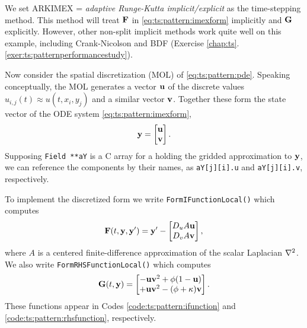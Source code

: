 We set ARKIMEX = \emph{adaptive Runge-Kutta implicit/explicit} \citep{AscherRuuthSpiteri1997} as the time-stepping method.  This method will treat $\mathbf{F}$ in \eqref{eq:ts:pattern:imexform} implicitly and $\mathbf{G}$ explicitly.  However, other non-split implicit methods work quite well on this example, including Crank-Nicolson and BDF (Exercise \ref{chap:ts}.\ref{exer:ts:patternperformancestudy}).


Now consider the spatial discretization (MOL) of \eqref{eq:ts:pattern:pde}.  Speaking conceptually, the MOL generates a vector $\mathbf{u}$ of the discrete values $u_{i,j}(t) \approx u(t,x_i,y_j)$ and a similar vector $\mathbf{v}$.  Together these form the state vector of the ODE system \eqref{eq:ts:pattern:imexform}, 
\begin{equation}
\mathbf{y} = \begin{bmatrix} \mathbf{u} \\ \mathbf{v} \end{bmatrix}.  \label{eq:ts:pattern:blockvars}
\end{equation}
Supposing \texttt{Field **aY} is a C array for a \pVec holding the gridded approximation to $\mathbf{y}$, we can reference the components by their names, as \texttt{aY[j][i].u} and \texttt{aY[j][i].v}, respectively.

To implement the discretized form we write \texttt{FormIFunctionLocal()} which computes
\begin{equation}
\mathbf{F}(t,\mathbf{y},\mathbf{y}') = \mathbf{y}' - \begin{bmatrix} D_u A \mathbf{u} \\ D_v A \mathbf{v} \end{bmatrix},  \label{eq:ts:pattern:blockifunction}
\end{equation}
where $A$ is a centered finite-difference approximation of the scalar Laplacian $\nabla^2$.  We also write \texttt{FormRHSFunctionLocal()} which computes
\begin{equation}
\mathbf{G}(t,\mathbf{y}) = \begin{bmatrix}
- \mathbf{u} \mathbf{v}^2 + \phi (1-\mathbf{u}) \\
+ \mathbf{u} \mathbf{v}^2 - (\phi + \kappa) \mathbf{v}
\end{bmatrix}. \label{eq:ts:pattern:blockrhsfunction}
\end{equation}
These functions appear in Codes \ref{code:ts:pattern:ifunction} and \ref{code:ts:pattern:rhsfunction}, respectively.

